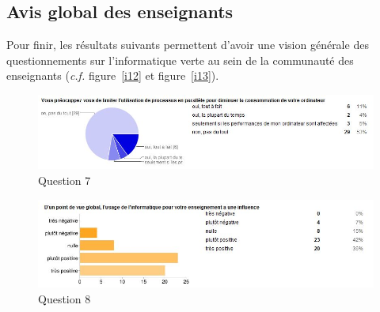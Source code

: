 \documentclass[a4paper,11pt,french]{article}
\begin{document}
\subsection{Avis global des enseignants}

Pour finir, les résultats suivants permettent d'avoir une vision générale des questionnements sur l'informatique verte au sein de la communauté des enseignants (\textit{c.f.} figure~\vref{i12} et figure~\vref{i13}).\\

\begin{figure}[h!]
\includegraphics[width=\textwidth]{i12.JPG}
\caption{Question 7}
\label{i12}
\end{figure}

\begin{figure}[h!]
\includegraphics[width=\textwidth]{i13.JPG}
\caption{Question 8}
\label{i13}
\end{figure}
\end{document}

